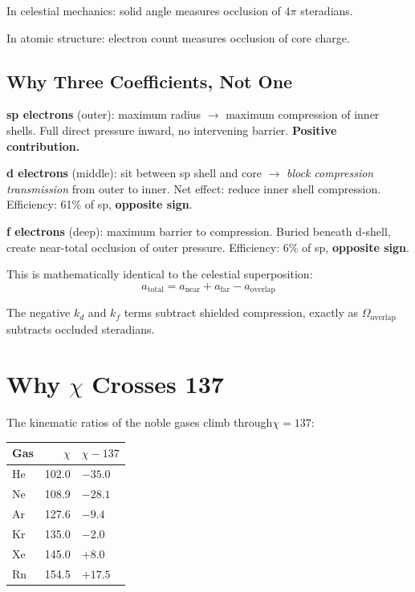 In celestial mechanics: solid angle measures occlusion of $4\pi$ steradians.

In atomic structure: electron count measures occlusion of core charge.

\subsection{Why Three Coefficients, Not One}

\textbf{sp electrons} (outer): maximum radius $\to$ maximum compression of inner shells.  Full direct pressure inward, no intervening barrier. \textbf{Positive contribution.}

\textbf{d electrons} (middle): sit between sp shell and core $\to$ \emph{block compression transmission} from outer to inner.  Net effect: reduce inner shell compression.  Efficiency: 61\% of sp, \textbf{opposite sign}.

\textbf{f electrons} (deep): maximum barrier to compression.  Buried beneath d-shell, create near-total occlusion of outer pressure.  Efficiency: 6\% of sp, \textbf{opposite sign}.

This is mathematically identical to the celestial superposition:
\begin{equation}
  a_{\text{total}} = a_{\text{near}} + a_{\text{far}} - a_{\text{overlap}}
\end{equation}

The negative $k_d$ and $k_f$ terms subtract shielded compression, exactly as $\Omega_{\text{overlap}}$ subtracts occluded steradians.


\section{Why $\chi$ Crosses 137}

The kinematic ratios of the noble gases climb through$\chi = 137$:
\begin{center}
\begin{tabular}{lrl}
\hline
\textbf{Gas} & $\chi$ & $\chi - 137$ \\
\hline
He &  102.0 & $-35.0$ \\
Ne &  108.9 & $-28.1$ \\
Ar &  127.6 & $-9.4$ \\
Kr &  135.0 & $-2.0$ \\
Xe &  145.0 & $+8.0$ \\
Rn &  154.5 & $+17.5$ \\
\hline
\end{tabular}
\end{center}


